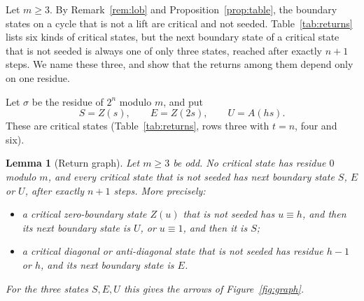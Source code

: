 \documentclass[11pt]{amsart}
\newtheorem{lemma}[theorem]{Lemma}
\theoremstyle{definition}
\theoremstyle{remark}
\begin{document}
Let $m\ge3$. By Remark~\ref{rem:lob} and Proposition~\ref{prop:table}, the boundary states on a cycle that is not a lift are critical and not seeded. Table~\ref{tab:returns} lists six kinds of critical states, but the next boundary state of a critical state that is not seeded is always one of only three states, reached after exactly $n+1$ steps. We name these three, and show that the returns among them depend only on one residue.

Let $\sigma$ be the residue of $2^n$ modulo $m$, and put
\[
S=Z(s),\qquad E=Z(2s),\qquad U=A(hs).
\]
These are critical states (Table~\ref{tab:returns}, rows three with $t=n$, four and six).

\begin{lemma}[Return graph]\label{lem:graph}
Let $m\ge3$ be odd. No critical state has residue $0$ modulo $m$, and every critical state that is not seeded has next boundary state $S$, $E$ or $U$, after exactly $n+1$ steps. More precisely:
\begin{itemize}
\item a critical zero-boundary state $Z(u)$ that is not seeded has $u\equiv h$, and then its next boundary state is $U$, or $u\equiv1$, and then it is $S$;
\item a critical diagonal or anti-diagonal state that is not seeded has residue $h-1$ or $h$, and its next boundary state is $E$.
\end{itemize}
For the three states $S,E,U$ this gives the arrows of Figure~\ref{fig:graph}.
\end{lemma}
\end{document}
